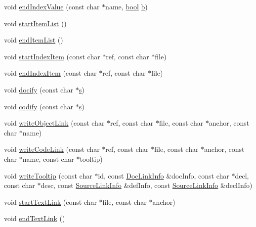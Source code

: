 \begin{DoxyCompactItemize}
\item 
void \hyperlink{class_output_list_a06d11b44b854f803a0eb267453f8561c}{end\+Index\+Value} (const char $\ast$name, \hyperlink{qglobal_8h_a1062901a7428fdd9c7f180f5e01ea056}{bool} \hyperlink{060__command__switch_8tcl_a68bdb74c144118d936931c46f75d4b3e}{b})
\item 
void \hyperlink{class_output_list_a1677b65eb8f01a10b1d767758338a212}{start\+Item\+List} ()
\item 
void \hyperlink{class_output_list_ac6efca5985597bb6e51427c51d40732f}{end\+Item\+List} ()
\item 
void \hyperlink{class_output_list_ae2d57b80570bd6200cf2bba40e7aebeb}{start\+Index\+Item} (const char $\ast$ref, const char $\ast$file)
\item 
void \hyperlink{class_output_list_ac4298a7ba49c15f18cc1c8fff9e4555d}{end\+Index\+Item} (const char $\ast$ref, const char $\ast$file)
\item 
void \hyperlink{class_output_list_a3335d926bd59e1c9e3912c4352ca5bc6}{docify} (const char $\ast$\hyperlink{060__command__switch_8tcl_a011c73f2dbb87635a3b4206c72355f6e}{s})
\item 
void \hyperlink{class_output_list_a81c7d3f51fa62b85c2699830f7170ccd}{codify} (const char $\ast$\hyperlink{060__command__switch_8tcl_a011c73f2dbb87635a3b4206c72355f6e}{s})
\item 
void \hyperlink{class_output_list_a8c499e7baca8905c8e057d23f72ff548}{write\+Object\+Link} (const char $\ast$ref, const char $\ast$file, const char $\ast$anchor, const char $\ast$name)
\item 
void \hyperlink{class_output_list_adebe51dec7320f28fe291d5e1dae740c}{write\+Code\+Link} (const char $\ast$ref, const char $\ast$file, const char $\ast$anchor, const char $\ast$name, const char $\ast$tooltip)
\item 
void \hyperlink{class_output_list_a3cebc68a6a4524ef4b78c4e81d5127eb}{write\+Tooltip} (const char $\ast$id, const \hyperlink{struct_doc_link_info}{Doc\+Link\+Info} \&doc\+Info, const char $\ast$decl, const char $\ast$desc, const \hyperlink{struct_source_link_info}{Source\+Link\+Info} \&def\+Info, const \hyperlink{struct_source_link_info}{Source\+Link\+Info} \&decl\+Info)
\item 
void \hyperlink{class_output_list_ad4fb4cab0e1a0f5e6e7b56ac820456c9}{start\+Text\+Link} (const char $\ast$file, const char $\ast$anchor)
\item 
void \hyperlink{class_output_list_a74e89e9bcca41e9203ca080fc127a004}{end\+Text\+Link} ()
\item 

\end{DoxyCompactItemize}
